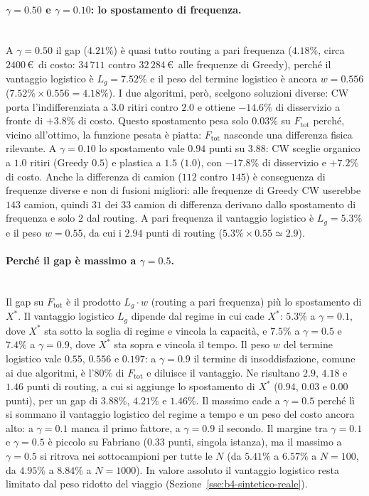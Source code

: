 \paragraph{$\gamma=0.50$ e $\gamma=0.10$: lo spostamento di frequenza.}\mbox{}\\
A $\gamma=0.50$ il gap ($4.21\%$) è quasi tutto routing a pari frequenza ($4.18\%$, circa $2400$\,\euro\ di costo: $34\,711$ contro $32\,284$\,\euro\ alle frequenze di Greedy), perché il vantaggio logistico è $L_g=7.52\%$ e il peso del termine logistico è ancora $w=0.556$ ($7.52\%\times0.556=4.18\%$). I due algoritmi, però, scelgono soluzioni diverse: CW porta l'indifferenziata a $3.0$ ritiri contro $2.0$ e ottiene $-14.6\%$ di disservizio a fronte di $+3.8\%$ di costo. Questo spostamento pesa solo $0.03\%$ su $F_{\mathrm{tot}}$ perché, vicino all'ottimo, la funzione pesata è piatta: $F_{\mathrm{tot}}$ nasconde una differenza fisica rilevante. A $\gamma=0.10$ lo spostamento vale $0.94$ punti su $3.88$: CW sceglie organico a $1.0$ ritiri (Greedy $0.5$) e plastica a $1.5$ ($1.0$), con $-17.8\%$ di disservizio e $+7.2\%$ di costo. Anche la differenza di camion ($112$ contro $145$) è conseguenza di frequenze diverse e non di fusioni migliori: alle frequenze di Greedy CW userebbe $143$ camion, quindi $31$ dei $33$ camion di differenza derivano dallo spostamento di frequenza e solo $2$ dal routing. A pari frequenza il vantaggio logistico è $L_g=5.3\%$ e il peso $w=0.55$, da cui i $2.94$ punti di routing ($5.3\%\times0.55\simeq2.9$).

\paragraph{Perché il gap è massimo a $\gamma=0.5$.}\mbox{}\\
Il gap su $F_{\mathrm{tot}}$ è il prodotto $L_g\cdot w$ (routing a pari frequenza) più lo spostamento di $X^*$. Il vantaggio logistico $L_g$ dipende dal regime in cui cade $X^*$: $5.3\%$ a $\gamma=0.1$, dove $X^*$ sta sotto la soglia di regime e vincola la capacità, e $7.5\%$ a $\gamma=0.5$ e $7.4\%$ a $\gamma=0.9$, dove $X^*$ sta sopra e vincola il tempo. Il peso $w$ del termine logistico vale $0.55$, $0.556$ e $0.197$: a $\gamma=0.9$ il termine di insoddisfazione, comune ai due algoritmi, è l'$80\%$ di $F_{\mathrm{tot}}$ e diluisce il vantaggio. Ne risultano $2.9$, $4.18$ e $1.46$ punti di routing, a cui si aggiunge lo spostamento di $X^*$ ($0.94$, $0.03$ e $0.00$ punti), per un gap di $3.88\%$, $4.21\%$ e $1.46\%$. Il massimo cade a $\gamma=0.5$ perché lì si sommano il vantaggio logistico del regime a tempo e un peso del costo ancora alto: a $\gamma=0.1$ manca il primo fattore, a $\gamma=0.9$ il secondo. Il margine tra $\gamma=0.1$ e $\gamma=0.5$ è piccolo su Fabriano ($0.33$ punti, singola istanza), ma il massimo a $\gamma=0.5$ si ritrova nei sottocampioni per tutte le $N$ (da $5.41\%$ a $6.57\%$ a $N=100$, da $4.95\%$ a $8.84\%$ a $N=1000$). In valore assoluto il vantaggio logistico resta limitato dal peso ridotto del viaggio (Sezione~\ref{sse:b4-sintetico-reale}).

